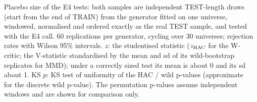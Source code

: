 Placebo size of the E4 tests: both samples are independent TEST-length draws (start from the end of TRAIN) from the generator fitted on one universe, windowed, normalised and ordered exactly as the real TEST sample, and tested with the E4 call. 60 replications per generator, cycling over 30 universes; rejection rates with Wilson 95\% intervals. $z$: the studentised statistic ($z_{\rm HAC}$ for the W-critic; the V-statistic standardised by the mean and sd of its wild-bootstrap replicates for MMD); under a correctly sized test its mean is about 0 and its sd about 1. KS $p$: KS test of uniformity of the HAC / wild p-values (approximate for the discrete wild p-value). The permutation p-values assume independent windows and are shown for comparison only.
